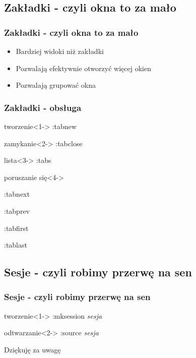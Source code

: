 \documentclass{beamer}
\begin{document}
\subsection{Zakładki - czyli okna to za mało}
\begin{frame}
	\frametitle{Zakładki - czyli okna to za mało}
	\begin{itemize}[<+->]
	\item Bardziej widoki niż zakładki
	\item Pozwalają efektywnie otworzyć więcej okien
	\item Pozwalają grupować okna
	\end{itemize}
\end{frame}
\begin{frame}
	\frametitle{Zakładki - obsługa}
	\begin{block}{tworzenie}<1->
		:tabnew
	\end{block}
	\begin{block}{zamykanie}<2->
		:tabclose
	\end{block}
	\begin{block}{lista}<3->
	:tabs
	\end{block}
	\begin{block}{poruszanie się}<4->
		\begin{itemize}
			{ \item :tabnext }
			{ \item :tabprev }
			{ \item :tabfirst }
			{ \item :tablast }
		\end{itemize}
	\end{block}
\end{frame}
\subsection{Sesje - czyli robimy przerwę na sen}
\begin{frame}
	\frametitle{Sesje - czyli robimy przerwę na sen}
	\begin{block}{tworzenie}<1->
	:mksession \textit{sesja}
	\end{block}
	\begin{block}{odtwarzanie}<2->
	:source \textit{sesja}
	\end{block}
\end{frame}
\begin{frame}
	Dziękuję za uwagę
\end{frame}
\end{document}
